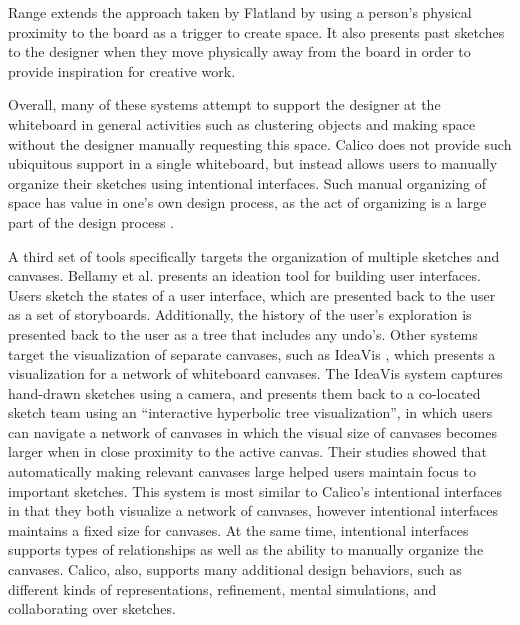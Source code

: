 Range \citep{Ju} extends the approach taken by Flatland by using a person's physical proximity to the board as a trigger to create space. It also presents past sketches to the designer when they move physically away from the board in order to provide inspiration for creative work. 

Overall, many of these systems attempt to support the designer at the whiteboard in general activities such as clustering objects and making space without the designer manually requesting this space. Calico does not provide such ubiquitous support in a single whiteboard, but instead allows users to manually organize their sketches using intentional interfaces. Such manual organizing of space has value in one's own design process, as the act of organizing is a large part of the design process \cite{Nickerson}.

A third set of tools specifically targets the organization of multiple sketches and canvases. Bellamy et al. \cite{Bellamy:2011:STI:1985793.1985909} presents an ideation tool for building user interfaces. Users sketch the states of a user interface, which are presented back to the user as a set of storyboards. Additionally, the history of the user's exploration is presented back to the user as a tree that includes any undo's. Other systems target the visualization of separate canvases, such as IdeaVis \cite{geyer2012ideavis}, which presents a visualization for a network of whiteboard canvases. The IdeaVis system captures hand-drawn sketches using a camera, and presents them back to a co-located sketch team using an ``interactive hyperbolic tree visualization'', in which users can navigate a network of canvases in which the visual size of canvases becomes larger when in close proximity to the active canvas. Their studies showed that automatically making relevant canvases large helped users maintain focus to important sketches. This system is most similar to Calico's intentional interfaces in that they both visualize a network of canvases, however intentional interfaces maintains a fixed size for canvases. At the same time, intentional interfaces supports types of relationships as well as the ability to manually organize the canvases. Calico, also, supports many additional design behaviors, such as different kinds of representations, refinement, mental simulations, and collaborating over sketches.

